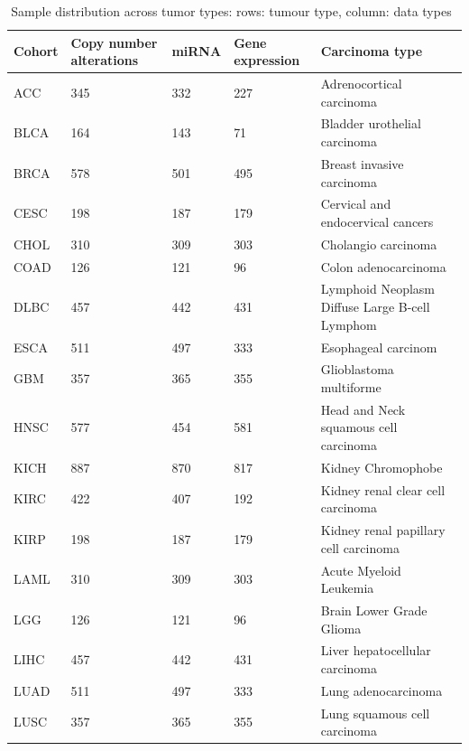 \begin{table} [h]
\centering
    \scriptsize
    \caption[Sample distribution across tumor types]{Sample distribution across tumor types: rows: tumour type, column: data types~\cite{weinstein2013cancer}}
    \label{table:alldatadetails2}
    \vspace{-2mm}
    \begin{tabular}{l|l|l|l|l}
        \hline
        \rowcolor{Gray}
         \textbf{Cohort} & \textbf{Copy number alterations} & \textbf{miRNA} & \textbf{Gene expression} & \textbf{Carcinoma type} \\\hline
            ACC & 345 & 332 & 227 & Adrenocortical carcinoma \\\hline
            BLCA & 164 & 143 & 71 & Bladder urothelial carcinoma \\\hline%
            BRCA  & 578 & 501 & 495 & Breast invasive carcinoma \\\hline
            CESC & 198 & 187 & 179 & Cervical and endocervical cancers	\\\hline%
            CHOL & 310 & 309 & 303 & Cholangio carcinoma \\\hline 
            COAD & 126 & 121 & 96 & Colon adenocarcinoma \\\hline 
            DLBC & 457 & 442 & 431 & Lymphoid Neoplasm Diffuse Large B-cell Lymphom  \\\hline
            ESCA & 511 & 497 & 333 & Esophageal carcinom \\\hline
            GBM & 357 & 365 & 355 & Glioblastoma multiforme \\\hline
            HNSC   & 577 & 454 & 581 & Head and Neck squamous cell carcinoma \\\hline
            KICH & 887 & 870 & 817 & Kidney Chromophobe  \\\hline
            KIRC & 422 & 407 & 192 & Kidney renal clear cell carcinoma \\\hline
            KIRP & 198 & 187 & 179 & Kidney renal papillary cell carcinoma	\\\hline%
            LAML & 310 & 309 & 303 & Acute Myeloid Leukemia \\\hline 
            LGG & 126 & 121 & 96 & Brain Lower Grade Glioma \\\hline 
            LIHC & 457 & 442 & 431 & Liver hepatocellular carcinoma  \\\hline
            LUAD & 511 & 497 & 333 & Lung adenocarcinoma \\\hline
            LUSC & 357 & 365 & 355 & Lung squamous cell carcinoma \\\hline

\end{tabular}
\end{table}
